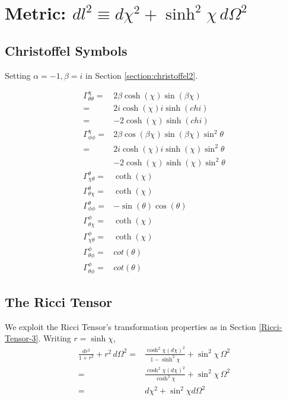 \documentclass[]{article}
\begin{document}
\section{Metric: $dl^2\equiv d\chi^2+\sinh^2 \chi\,d\Omega^2$} \label{section:metric4}

\subsection{Christoffel Symbols}

Setting $\alpha=-1,\beta=i$ in Section \ref{section:christoffel2}.

\begin{align*}
\Gamma^{\chi}_{\theta\theta}=&2\beta \cosh{(\chi)}\sin{(\beta\chi)}\\
=&2i \cosh{(\chi)}i \sinh{(chi)}\\
=&-2 \cosh{(\chi)} \sinh{(chi)}\\
\Gamma^{\chi}_{\phi\phi}=&2\beta \cos{(\beta\chi)}\sin{(\beta\chi)}\sin^2 \theta\\
=&2i \cosh{(\chi)} i \sinh{(\chi)}\sin^2 \theta\\
&-2 \cosh{(\chi)}  \sinh{(\chi)}\sin^2 \theta\\
\Gamma^{\theta}_{\chi\theta}=&\coth{(\chi)}\\
\Gamma^{\theta}_{\theta\chi}=&\coth{(\chi)}\\
\Gamma^{\theta}_{\phi\phi}=&-\sin{(\theta)}\cos{(\theta)}\\
\Gamma^{\phi}_{\theta\chi}=&\coth{(\chi)}\\
\Gamma^{\phi}_{\chi\theta}=&\coth{(\chi)}\\
\Gamma^{\phi}_{\theta\phi}=&cot{(\theta)}\\
\Gamma^{\phi}_{\theta\phi}=&cot{(\theta)}
\end{align*}

\subsection{The Ricci Tensor}

We exploit the Ricci Tensor's transformation properties as in Section \ref{Ricci-Tensor-3}. Writing $r=\sinh \chi$,
\begin{align*}
\frac{dr^2}{1+r^2}+r^2\,d\Omega^2=&\frac{\cosh^2 \chi (d \chi)^2}{1-\sinh^2 \chi}+\sin^2 \chi\,\Omega^2\\
=&\frac{\cosh^2 \chi (d \chi)^2}{\cosh^2 \chi}+\sin^2 \chi\,\Omega^2\\
=&d\chi^2 + \sin^2 \chi d\Omega^2
\end{align*}
\end{document}
